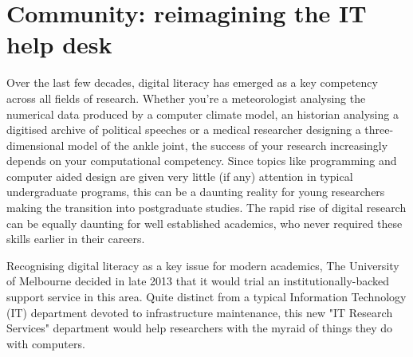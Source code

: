 \section{Community: reimagining the IT help desk}

Over the last few decades, digital literacy has emerged as a key competency across all fields of research. Whether you're a meteorologist analysing the numerical data produced by a computer climate model, an historian analysing a digitised archive of political speeches or a medical researcher designing a three-dimensional model of the ankle joint, the success of your research increasingly depends on your computational competency. Since topics like programming and computer aided design are given very little (if any) attention in typical undergraduate programs, this can be a daunting reality for young researchers making the transition into postgraduate studies. The rapid rise of digital research can be equally daunting for well established academics, who never required these skills earlier in their careers.

Recognising digital literacy as a key issue for modern academics, The University of Melbourne decided in late 2013 that it would trial an institutionally-backed support service in this area. Quite distinct from a typical Information Technology (IT) department devoted to infrastructure maintenance, this new "IT Research Services" department would help researchers with the myraid of things they do with computers.   